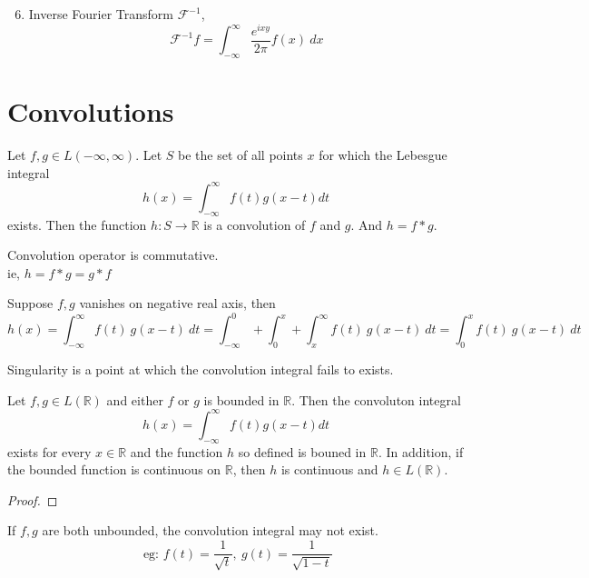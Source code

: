 \begin{enumerate}
	\setcounter{enumi}{5}
	\item Inverse Fourier Transform $\mathscr{F}^{-1}$,
		\[ \mathscr{F}^{-1}f = \int_{-\infty}^\infty \frac{e^{ixy}}{2\pi}f(x)\ dx \]
\end{enumerate}

\section{Convolutions}
\begin{definition}
	Let \( f,g \in L(-\infty,\infty) \). Let $S$ be the set of all points $x$ for which the Lebesgue integral
	\[ h(x) = \int_{-\infty}^\infty f(t) g(x-t) dt \]
	exists. Then the function \( h : S \to \mathbb{R} \) is a convolution of $f$ and $g$. And \( h = f \ast g \).
\end{definition}

\begin{remark}
	Convolution operator is commutative.\\
	ie, \( h = f \ast g = g \ast f \)
\end{remark}

\begin{remark}
	Suppose $f,g$ vanishes on negative real axis, then
	\[ h(x) = \int_{-\infty}^\infty f(t)\ g(x-t)\ dt = \int_{-\infty}^0 + \int_0^x  + \int_x^\infty f(t)\ g(x-t)\ dt = \int_0^x f(t)\ g(x-t)\ dt \] 
\end{remark}

\begin{remark}
	Singularity is a point at which the convolution integral fails to exists.
\end{remark}

\begin{theorem}
	Let \( f,g \in L(\mathbb{R}) \) and either $f$ or $g$ is bounded in $\mathbb{R}$. Then the convoluton integral
	\[ h(x) = \int_{-\infty}^\infty f(t) g(x-t) dt \]
	exists for every \( x \in \mathbb{R} \) and the function $h$ so defined is bouned in $\mathbb{R}$. In addition, if the bounded function is continuous on $\mathbb{R}$, then $h$ is continuous and \( h \in L(\mathbb{R}) \).
\end{theorem}
\begin{synopsis}
\end{synopsis}
\begin{proof}
\end{proof}

\begin{remark}
	If $f,g$ are both unbounded, the convolution integral may not exist.
	\[ \text{ eg: } f(t) = \frac{1}{\sqrt{t}},\ g(t) = \frac{1}{\sqrt{1-t}} \]
\end{remark}

